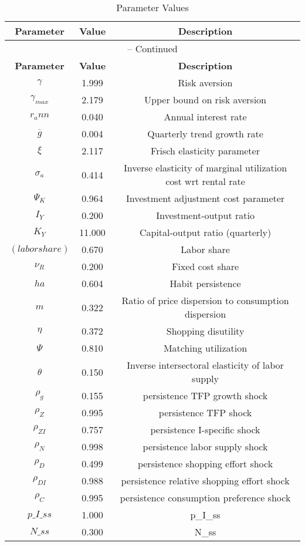 \begin{center}
\begin{longtable}{ccc}
\caption{Parameter Values}\\%
\toprule%
\multicolumn{1}{c}{\textbf{Parameter}} &
\multicolumn{1}{c}{\textbf{Value}} &
 \multicolumn{1}{c}{\textbf{Description}}\\%
\midrule%
\endfirsthead
\multicolumn{3}{c}{{\tablename} \thetable{} -- Continued}\\%
\midrule%
\multicolumn{1}{c}{\textbf{Parameter}} &
\multicolumn{1}{c}{\textbf{Value}} &
  \multicolumn{1}{c}{\textbf{Description}}\\%
\midrule%
\endhead
${\gamma}$ 	 & 	 1.999 	 & 	 Risk aversion\\
${\gamma_{max}}$ 	 & 	 2.179 	 & 	 Upper bound on risk aversion\\
${r_ann}$ 	 & 	 0.040 	 & 	 Annual interest rate\\
${\overline{g}}$ 	 & 	 0.004 	 & 	 Quarterly trend growth rate\\
$\xi$ 	 & 	 2.117 	 & 	 Frisch elasticity parameter\\
${\sigma_a}$ 	 & 	 0.414 	 & 	 Inverse elasticity of marginal utilization cost wrt rental rate\\
${\Psi_K}$ 	 & 	 0.964 	 & 	 Investment adjustment cost parameter\\
${I_Y}$ 	 & 	 0.200 	 & 	 Investment-output ratio\\
${K_Y}$ 	 & 	 11.000 	 & 	 Capital-output ratio (quarterly)\\
$(labor share)$ 	 & 	 0.670 	 & 	 Labor share\\
${\nu_R}$ 	 & 	 0.200 	 & 	 Fixed cost share\\
${ha}$ 	 & 	 0.604 	 & 	 Habit persistence\\
${m}$ 	 & 	 0.322 	 & 	 Ratio of price dispersion to consumption dispersion\\
${\eta}$ 	 & 	 0.372 	 & 	 Shopping disutility\\
${\Psi}$ 	 & 	 0.810 	 & 	 Matching utilization\\
${\theta}$ 	 & 	 0.150 	 & 	 Inverse intersectoral elasticity of labor supply\\
${\rho_g}$ 	 & 	 0.155 	 & 	 persistence TFP growth shock\\
${\rho_Z}$ 	 & 	 0.995 	 & 	 persistence TFP shock\\
${\rho_{ZI}}$ 	 & 	 0.757 	 & 	 persistence I-specific shock\\
${\rho_N}$ 	 & 	 0.998 	 & 	 persistence labor supply shock\\
${\rho_D}$ 	 & 	 0.499 	 & 	 persistence shopping effort shock\\
${\rho_{DI}}$ 	 & 	 0.988 	 & 	 persistence relative shopping effort shock\\
${\rho_C}$ 	 & 	 0.995 	 & 	 persistence consumption preference shock\\
$p\_I\_ss$ 	 & 	 1.000 	 & 	 p\_I\_ss\\
$N\_ss$ 	 & 	 0.300 	 & 	 N\_ss\\
\bottomrule%
\end{longtable}
\end{center}
